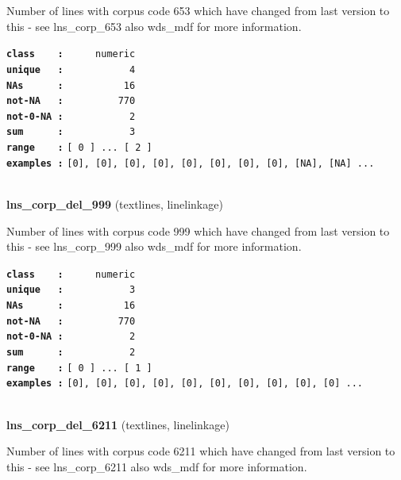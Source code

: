\documentclass[]{article}
\begin{document}
Number of lines with corpus code 653 which have changed from last
version to this - see lns\_corp\_653 also wds\_mdf for more information.

\textbf{\texttt{class\ \ \ \ :}} \texttt{~~~~~numeric}\\
\textbf{\texttt{unique\ \ \ :}} \texttt{~~~~~~~~~~~4}\\
\textbf{\texttt{NAs\ \ \ \ \ \ :}} \texttt{~~~~~~~~~~16}\\
\textbf{\texttt{not-NA\ \ \ :}} \texttt{~~~~~~~~~770}\\
\textbf{\texttt{not-0-NA\ :}} \texttt{~~~~~~~~~~~2}\\
\textbf{\texttt{sum\ \ \ \ \ \ :}} \texttt{~~~~~~~~~~~3}\\
\textbf{\texttt{range\ \ \ \ :}}
\texttt{{[}\ 0\ {]}\ ...\ {[}\ 2\ {]}}\\
\textbf{\texttt{examples\ :}}
\texttt{{[}0{]},\ {[}0{]},\ {[}0{]},\ {[}0{]},\ {[}0{]},\ {[}0{]},\ {[}0{]},\ {[}0{]},\ {[}NA{]},\ {[}NA{]}\ ...}\\

~

\textbf{lns\_corp\_del\_999} (textlines, linelinkage)

Number of lines with corpus code 999 which have changed from last
version to this - see lns\_corp\_999 also wds\_mdf for more information.

\textbf{\texttt{class\ \ \ \ :}} \texttt{~~~~~numeric}\\
\textbf{\texttt{unique\ \ \ :}} \texttt{~~~~~~~~~~~3}\\
\textbf{\texttt{NAs\ \ \ \ \ \ :}} \texttt{~~~~~~~~~~16}\\
\textbf{\texttt{not-NA\ \ \ :}} \texttt{~~~~~~~~~770}\\
\textbf{\texttt{not-0-NA\ :}} \texttt{~~~~~~~~~~~2}\\
\textbf{\texttt{sum\ \ \ \ \ \ :}} \texttt{~~~~~~~~~~~2}\\
\textbf{\texttt{range\ \ \ \ :}}
\texttt{{[}\ 0\ {]}\ ...\ {[}\ 1\ {]}}\\
\textbf{\texttt{examples\ :}}
\texttt{{[}0{]},\ {[}0{]},\ {[}0{]},\ {[}0{]},\ {[}0{]},\ {[}0{]},\ {[}0{]},\ {[}0{]},\ {[}0{]},\ {[}0{]}\ ...}\\

~

\textbf{lns\_corp\_del\_6211} (textlines, linelinkage)

Number of lines with corpus code 6211 which have changed from last
version to this - see lns\_corp\_6211 also wds\_mdf for more
information.
\end{document}
